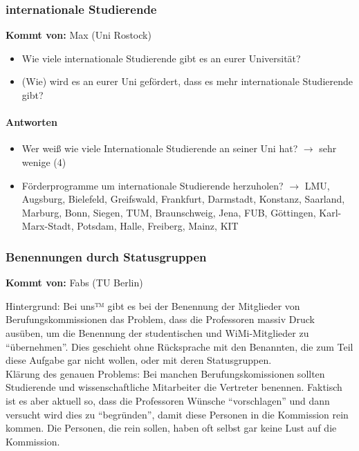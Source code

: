     \subsubsection*{internationale Studierende}
      \textbf{Kommt von:} Max (Uni Rostock)

      \begin{itemize}
        \item Wie viele internationale Studierende gibt es an eurer Universität?
        \item (Wie) wird es an eurer Uni gefördert, dass es mehr internationale Studierende gibt?
      \end{itemize}

      \paragraph{Antworten}
        \begin{itemize}
          \item Wer weiß wie viele Internationale Studierende an seiner Uni hat? $\rightarrow$ sehr wenige (4)
          \item Förderprogramme um internationale Studierende herzuholen? $\rightarrow$ LMU, Augsburg, Bielefeld, Greifswald, Frankfurt, Darmstadt, Konstanz, Saarland, Marburg, Bonn, Siegen, TUM, Braunschweig, Jena, FUB, Göttingen, Karl-Marx-Stadt, Potsdam, Halle, Freiberg, Mainz, KIT
        \end{itemize}

    \subsubsection*{Benennungen durch Statusgruppen}
      \textbf{Kommt von:} Fabs (TU Berlin)

      Hintergrund: Bei uns™ gibt es bei der Benennung der Mitglieder von Berufungskommissionen das Problem, dass die Professoren massiv Druck ausüben, um die Benennung der studentischen und WiMi-Mitglieder zu “übernehmen”. Dies geschieht ohne Rücksprache mit den Benannten, die zum Teil diese Aufgabe gar nicht wollen, oder mit deren Statusgruppen. \\

      Klärung des genauen Problems:
      Bei manchen Berufungskomissionen sollten Studierende und wissenschaftliche Mitarbeiter die Vertreter benennen.
      Faktisch ist es aber aktuell so, dass die Professoren Wünsche “vorschlagen” und dann versucht wird dies zu “begründen”, damit diese Personen in die Kommission rein kommen. Die Personen, die rein sollen, haben oft selbst gar keine Lust auf die Kommission. \\

